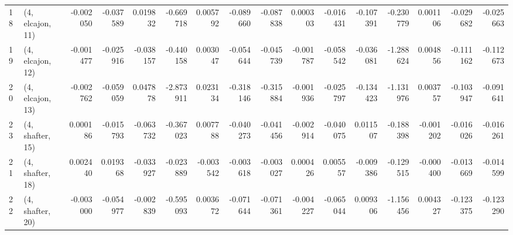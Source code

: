 \begin{tabular}{llrrrrrrrrrrrrrr}
18 &  (4, elcajon, 11) &  -0.002050 & -0.037589 &  0.019832 &  -0.669718 &  0.005792 &  -0.089660 & -0.087838 &  0.000303 & -0.016431 & -0.107391 &  -0.230779 &  0.001106 & -0.029682 & -0.025663 \\
19 &  (4, elcajon, 12) &  -0.001477 & -0.025916 & -0.038157 &  -0.440158 &  0.003047 &  -0.054644 & -0.045739 & -0.001787 & -0.058542 & -0.036081 &  -1.288624 &  0.004856 & -0.111162 & -0.112673 \\
20 &  (4, elcajon, 13) &  -0.002762 & -0.059059 &  0.047878 &  -2.873911 &  0.023134 &  -0.318146 & -0.315884 & -0.001936 & -0.025797 & -0.134423 &  -1.131976 &  0.003757 & -0.103947 & -0.091641 \\
23 &  (4, shafter, 15) &   0.000186 & -0.015793 & -0.063732 &  -0.367023 &  0.007788 &  -0.040273 & -0.041456 & -0.002914 & -0.040075 &  0.011507 &  -0.188398 & -0.001202 & -0.016026 & -0.016261 \\
21 &  (4, shafter, 18) &   0.002440 &  0.019368 & -0.033927 &  -0.023889 & -0.003542 &  -0.003618 & -0.003027 &  0.000426 &  0.005557 & -0.009386 &  -0.129515 & -0.000400 & -0.013669 & -0.014599 \\
22 &  (4, shafter, 20) &  -0.003000 & -0.054977 & -0.002839 &  -0.595093 &  0.003672 &  -0.071644 & -0.071361 & -0.004227 & -0.065044 &  0.009306 &  -1.156456 &  0.004327 & -0.123375 & -0.123290 \\
\bottomrule
\end{tabular}
